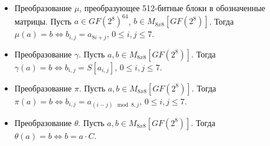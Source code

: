 \documentclass{./civarticle}
\begin{document}
\begin{itemize}

    \item Преобразование $\mu$, преобразующее 512-битные блоки в обозначенные матрицы. Пусть $a \in GF(2^8)^{64}$, $b \in M_{8x8}[GF(2^8)]$. Тогда $\mu(a) = b \iff b_{i, j} = a_{8i + j}$, $0 \leq i, j \leq 7$.

    \item Преобразование $\gamma$. Пусть $a, b \in  M_{8x8}[GF(2^8)]$. Тогда $\gamma(a) = b \iff b_{i, j} = S[a_{i, j}]$, $0 \leq i, j \leq 7$.
    
    \begin{figure}[h!]
        \end{figure}

    \item Преобразование $\pi$. Пусть $a, b \in  M_{8x8}[GF(2^8)]$. Тогда $\pi(a) = b \iff b_{i,j} = a_{(i-j) \mod 8, j}$, $0 \leq i, j \leq 7$.

    \item Преобразование $\theta$. Пусть $a, b \in  M_{8x8}[GF(2^8)]$. Тогда $\theta(a) = b \iff b = a \cdot C$.
    
    \begin{figure}[h!]
        \end{figure}


\end{itemize}
\end{document}
